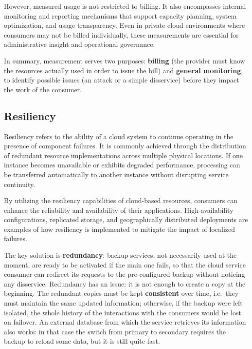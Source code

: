 However, measured usage is not restricted to billing. It also encompasses internal monitoring and reporting mechanisms that support capacity planning, system optimization, and usage transparency. Even in private cloud environments where consumers may not be billed individually, these measurements are essential for administrative insight and operational governance.

In summary, measurement serves two purposes: \textbf{billing} (the provider must know the resources actually used in order to issue the bill) and \textbf{general monitoring}, to identify possible issues (an attack or a simple disservice) before they impact the work of the consumer.


\subsection{Resiliency}

Resiliency refers to the ability of a cloud system to continue operating in the presence of component failures. It is commonly achieved through the distribution of redundant resource implementations across multiple physical locations. If one instance becomes unavailable or exhibits degraded performance, processing can be transferred automatically to another instance without disrupting service continuity.

\begin{center}
\end{center}

By utilizing the resiliency capabilities of cloud-based resources, consumers can enhance the reliability and availability of their applications. High-availability configurations, replicated storage, and geographically distributed deployments are examples of how resiliency is implemented to mitigate the impact of localized failures.

The key solution is \textbf{redundancy}: backup services, not necessarily used at the moment, are ready to be activated if the main one fails, so that the cloud service consumer can redirect its requests to the pre-configured backup without noticing any disservice. Redundancy has an issue: it is not enough to create a copy at the beginning. The redundant copies must be kept \textbf{consistent} over time, i.e.\ they must maintain the same updated information; otherwise, if the backup were left isolated, the whole history of the interactions with the consumers would be lost on failover. An external database from which the service retrieves its information also works: in that case the switch from primary to secondary requires the backup to reload some data, but it is still quite fast.


